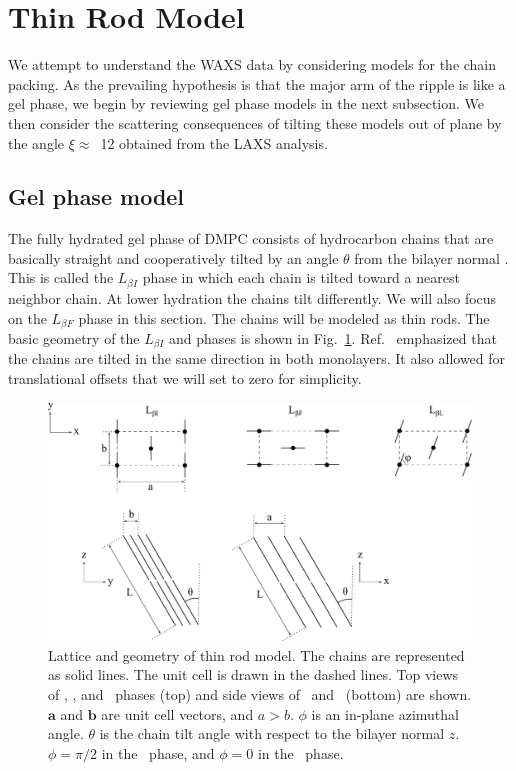\newpage
\section{Thin Rod Model}\label{sec:thin_rod_model}
We attempt to understand the WAXS data by considering models for the chain 
packing.  As the prevailing hypothesis is that the major arm of the ripple is 
like a gel phase, we begin by reviewing gel phase models in the next subsection.  
We then consider the scattering consequences of tilting these models out of 
plane by the angle $\xi\approx$~12{\textdegree} obtained from the LAXS analysis.

\subsection{Gel phase model}\label{sec:gel_model}
The fully hydrated gel phase of DMPC consists of hydrocarbon chains that are 
basically straight and cooperatively tilted by an angle $\theta$ from the 
bilayer normal \cite{ref:Smith88,ref:Tristram93,ref:Sun94,Tristram-Nagle02}. 
This is called the $L_{{\beta}I}$ phase in which each chain is tilted toward 
a nearest neighbor chain. At lower hydration the chains tilt differently. 
We will also focus on the $L_{{\beta}F}$ phase in this section.  The chains 
will be modeled as thin rods.  The basic geometry of the $L_{{\beta}I}$ 
and \LbetaF phases
is shown in Fig.~\ref{fig:gel_thin_rod}.  
Ref.~\cite{ref:Sun94} emphasized that the chains 
are tilted in the same direction in both monolayers. It also allowed for 
translational offsets that we will set to zero for simplicity.  

\begin{figure}[htbp]
  \centering
  \includegraphics[width=\textwidth]{figures/ripple/thin_rod_model/gel_thin_rod}
  \caption{Lattice and geometry of thin rod model. 
  The chains are represented as solid lines. The unit cell is drawn
  in the dashed lines.
  Top views of \LbetaI, \LbetaF, and \LbetaL\ phases (top)
  and side views of \LbetaI\ and \LbetaF\ (bottom) are shown.
  $\mathbf{a}$ and $\mathbf{b}$ are unit cell vectors, and $a > b$.
  $\phi$ is an in-plane azimuthal angle. 
  $\theta$ is the chain tilt angle with respect to the bilayer normal $z$.  
  $\phi=\pi/2$ in the \LbetaI\ phase, and $\phi=0$ in the \LbetaF\ phase.}
  \label{fig:gel_thin_rod}
\end{figure}

